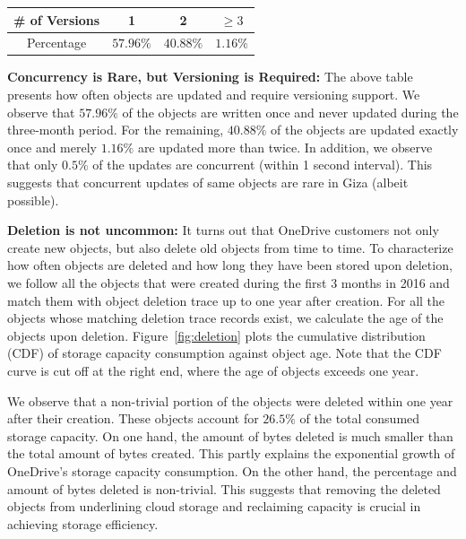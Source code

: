 \begin{table}[h]
\footnotesize
\centering
\begin{tabular}{c||c|c|c}
\# of Versions 	& 	1				& 2					& $\ge 3$
\\ \hline
Percentage			& $57.96\%$	& $40.88\%$	& $1.16\%$
\end{tabular}
\label{tab:version}
\end{table}
{\bf Concurrency is Rare, but Versioning is Required:} The above table presents how often objects are updated and require versioning support. We observe that $57.96\%$ of the objects are written once and never updated during the three-month period. For the remaining, $40.88\%$ of the objects are updated exactly once and merely $1.16\%$ are updated more than twice. In addition, we observe that only $0.5\%$ of the updates
are concurrent (within 1 second interval). This suggests that concurrent updates of same objects are rare in Giza (albeit possible).

{\bf Deletion is not uncommon:} It turns out that OneDrive customers not only
create new objects, but also delete old objects from time to time. To
characterize how often objects are deleted and how long they have been stored
upon deletion, we follow all the objects that were created during the first 3
months in 2016 and match them with object deletion trace up to one year after
creation. For all the objects whose matching deletion trace records exist, we
calculate the age of the objects upon deletion. Figure~\ref{fig:deletion} plots
the cumulative distribution (CDF) of storage capacity consumption against object
age. Note that the CDF curve is cut off at the right end, where the age of
objects exceeds one year.

We observe that a non-trivial portion of the objects were deleted within one
year after their creation. These objects account for $26.5\%$ of the total
consumed storage capacity. On one hand, the amount of bytes deleted is much
smaller than the total amount of bytes created. This partly explains the
exponential growth of OneDrive's storage capacity consumption. On the other
hand, the percentage and amount of bytes deleted is non-trivial. This suggests
that removing the deleted objects from underlining cloud storage and reclaiming
capacity is crucial in achieving storage efficiency.


